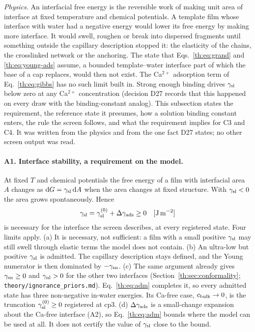 \providecommand{\Pads}{\Pi_\mathrm{ads}}
\providecommand{\KCaL}{K_\mathrm{CaL}}
\providecommand{\cstd}{c^{\circ}}
\providecommand{\radm}{r_\mathrm{ads}}
\providecommand{\Madm}{M_\mathrm{adm}}
\textit{Physics.} An interfacial free energy is the reversible work of making unit area of interface
at fixed temperature and chemical potentials. A template film whose interface with water had a
negative energy would lower its free energy by making more interface. It would swell, roughen or
break into dispersed fragments until something outside the capillary description stopped it: the
elasticity of the chains, the crosslinked network or the anchoring. The state that
Eqs.~\eqref{th:eq:grand} and \eqref{th:eq:young-ads} assume, a bounded template--water interface part of
which the base of a cap replaces, would then not exist. The Ca$^{2+}$ adsorption term of
Eq.~\eqref{th:eq:gibbs} has no such limit built in. Strong enough binding drives $\gamma_\mathrm{sl}$ below zero at
any Ca$^{2+}$ concentration (decision D27 records that this happened on every draw with the
binding-constant analog). This subsection states the requirement, the reference state it presumes, how
a solution binding constant enters, the rule the screen follows, and what the requirement implies for
C3 and C4. It was written from the physics and from the one fact D27 states; no other screen output
was read.

\paragraph{A1. Interface stability, a requirement on the model.} At fixed $T$ and chemical
potentials the free energy of a film with interfacial area $A$ changes as $\mathrm{d} G=\gamma_\mathrm{sl}\,\mathrm{d} A$ when the
area changes at fixed structure. With $\gamma_\mathrm{sl}<0$ the area grows spontaneously. Hence
\begin{equation}\label{th:eq:adm}
\gamma_\mathrm{sl}=\gamma_\mathrm{sl}^{(0)}+\Delta\gamma_\mathrm{ads}\ge0 \quad[\mathrm{J\,m^{-2}}]
\end{equation}
is necessary for the interface the screen describes, at every registered state. Four limits apply.
(a) It is necessary, not sufficient: a film with a small positive $\gamma_\mathrm{sl}$ may still swell through
elastic terms the model does not contain. (b) An ultra-low but positive $\gamma_\mathrm{sl}$ is admitted. The
capillary description stays defined, and the Young numerator is then dominated by $-\gamma_\mathrm{sn}$. (c) The
same argument already gives $\gamma_\mathrm{sn}\ge0$ and $\gamma_\mathrm{nl}>0$ for the other two interfaces
(Section~\ref{th:sec:conformality}; \texttt{theory/ignorance\_priors.md}).
Eq.~\eqref{th:eq:adm} completes it, so every admitted state has three non-negative in-water energies.
Its Ca-free case, $c_\mathrm{bulk}\to0$, is the truncation $\gamma_\mathrm{sl}^{(0)}\ge0$ registered at cp3. (d) $\Delta\gamma_\mathrm{ads}$ is a
small-change expansion about the Ca-free interface (A2), so Eq.~\eqref{th:eq:adm} bounds where the
model can be used at all. It does not certify the value of $\gamma_\mathrm{sl}$ close to the bound.

